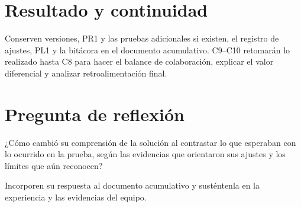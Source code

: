 \section*{Resultado y continuidad}
Conserven versiones, PR1 y las pruebas adicionales si existen, el registro de ajustes, PL1 y la bitácora en el documento acumulativo. C9--C10 retomarán lo realizado hasta C8 para hacer el balance de colaboración, explicar el valor diferencial y analizar retroalimentación final.

\section*{Pregunta de reflexión}
¿Cómo cambió su comprensión de la solución al contrastar lo que esperaban con lo ocurrido en la prueba, según las evidencias que orientaron sus ajustes y los límites que aún reconocen?

Incorporen su respuesta al documento acumulativo y susténtenla en la experiencia y las evidencias del equipo.


